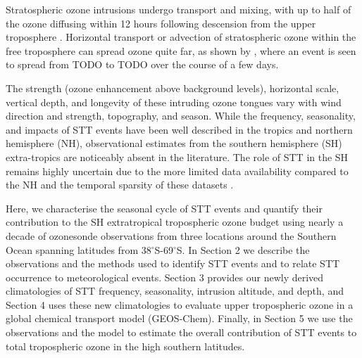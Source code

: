 \documentclass[acp, manuscript]{copernicus} %
\begin{document}
  Stratospheric ozone intrusions undergo transport and mixing, with up to half of the ozone diffusing within 12 hours following descension from the upper troposphere \citep{Trickl2014}.
  Horizontal transport or advection of stratospheric ozone within the free troposphere can spread ozone quite far, as shown by \cite{Cooper2004}, where an event is seen to spread from TODO to TODO over the course of a few days.
  
  The strength (ozone enhancement above background levels), horizontal scale, vertical depth, and longevity of these intruding ozone tongues vary with wind direction and strength, topography, and season.
  While the frequency, seasonality, and impacts of STT events have been well described in the tropics and northern hemisphere (NH), observational estimates from the southern hemisphere (SH) extra-tropics are noticeably absent in the literature. 
  The role of STT in the SH remains highly uncertain due to the more limited data availability compared to the NH and the temporal sparsity of these datasets \citep{Mze2010, Thompson2014, Liu2015}. 

  Here, we characterise the seasonal cycle of STT events and quantify their contribution to the SH extratropical tropospheric ozone budget using nearly a decade of ozonesonde observations from three locations around the Southern Ocean spanning latitudes from 38$^{\circ}$S-69$^{\circ}$S. 
  In Section 2 we describe the observations and the methods used to identify STT events and to relate STT occurrence to meteorological events.
  Section 3 provides our newly derived climatologies of STT frequency, seasonality, intrusion altitude, and depth, and Section 4 uses these new climatologies to evaluate upper tropospheric ozone in a global chemical transport model (GEOS-Chem). 
  Finally, in Section 5 we use the observations and the model to estimate the overall contribution of STT events to total tropospheric ozone in the high southern latitudes.
\end{document}
